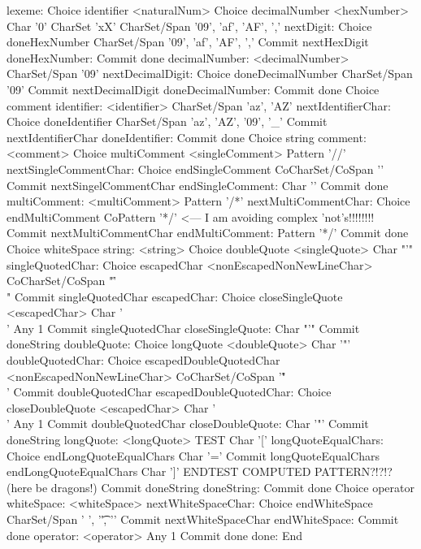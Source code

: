 \starttyping
lexeme:
  Choice identifier
    <naturalNum>
    Choice decimalNumber
      <hexNumber>
      Char '0'
      CharSet 'xX'
      CharSet/Span {'09', 'af', 'AF', ','}
    nextDigit:
      Choice doneHexNumber
      CharSet/Span {'09', 'af', 'AF', ','}
      Commit nextHexDigit
    doneHexNumber:
    Commit done
  decimalNumber:
      <decimalNumber>
      CharSet/Span '09'
    nextDecimalDigit:
      Choice doneDecimalNumber
      CharSet/Span '09'
      Commit nextDecimalDigit
    doneDecimalNumber:
    Commit done
  Choice comment
identifier:
    <identifier>
    CharSet/Span {'az', 'AZ'}
  nextIdentifierChar:
    Choice doneIdentifier
      CharSet/Span {'az', 'AZ', '09', '_'}
      Commit nextIdentifierChar
  doneIdentifier:
    Commit done
  Choice string
comment:
    <comment>
    Choice multiComment
      <singleComment>
      Pattern '//'
    nextSingleCommentChar:
      Choice endSingleComment
      CoCharSet/CoSpan '\n'
      Commit nextSingelCommentChar
    endSingleComment:
      Char '\n'
      Commit done
    multiComment:
      <multiComment>
      Pattern '/*'
    nextMultiCommentChar:
      Choice endMultiComment
      CoPattern '*/'                <--- I am avoiding complex 'not's!!!!!!!!
      Commit nextMultiCommentChar
    endMultiComment:
      Pattern '*/'
      Commit done
  Choice whiteSpace
string:
    <string>
    Choice doubleQuote
      <singleQuote>
      Char "'"
    singleQuotedChar:
      Choice escapedChar
        <nonEscapedNonNewLineChar>
        CoCharSet/CoSpan "'\r\n\f\\"
        Commit singleQuotedChar
      escapedChar:
        Choice closeSingleQuote
        <escapedChar>
        Char '\\'
        Any 1
        Commit singleQuotedChar
      closeSingleQuote:
        Char "'"
      Commit doneString
    doubleQuote:
    Choice longQuote
      <doubleQuote>
      Char '"'
    doubleQuotedChar:
      Choice escapedDoubleQuotedChar
        <nonEscapedNonNewLineChar>
        CoCharSet/CoSpan '"\r\n\f\\'
        Commit doubleQuotedChar
      escapedDoubleQuotedChar:
        Choice closeDoubleQuote
        <escapedChar>
        Char '\\'
        Any 1
        Commit doubleQuotedChar
      closeDoubleQuote:
        Char '"'
      Commit doneString
    longQuote:
      <longQuote>
      TEST
        Char '['
        longQuoteEqualChars:
          Choice endLongQuoteEqualChars
            Char '='
            Commit longQuoteEqualChars
        endLongQuoteEqualChars
        Char ']'
      ENDTEST
      COMPUTED PATTERN?!?!? (here be dragons!)
      Commit doneString
  doneString:
    Commit done
  Choice operator
whiteSpace:
    <whiteSpace>
  nextWhiteSpaceChar:
    Choice endWhiteSpace
    CharSet/Span {' ', '\t', '\n'}
    Commit nextWhiteSpaceChar
  endWhiteSpace:
    Commit done
operator:
    <operator>
    Any 1
    Commit done
done:
  End
\stoptyping

\startCHeader

\stopCHeader

\startCCode

\stopCCode

